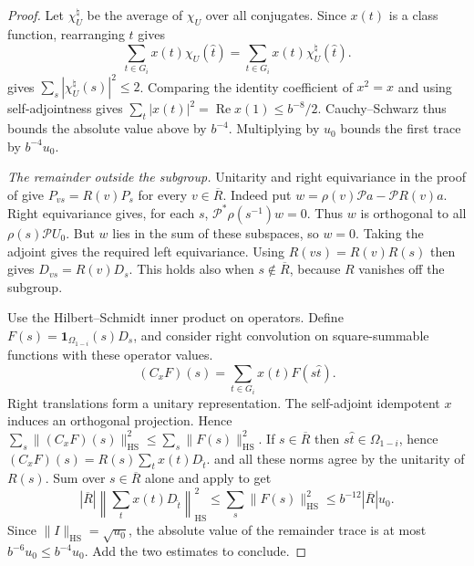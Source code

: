 \begin{proof}
Let $\chi_U^\natural$ be the average of $\chi_U$ over all conjugates.
Since $x(t)$ is a class function, rearranging $t$ gives
\[
 \sum_{t\in G_i}x(t)\chi_U(\widehat t)
 =\sum_{t\in G_i}x(t)\chi_U^\natural(\widehat t).
\]
 gives $\sum_s|\chi_U^\natural(s)|^2\le 2$.
Comparing the identity coefficient of $x^2=x$ and using self-adjointness gives
$\sum_t|x(t)|^2=\operatorname{Re}x(1)\le b^{-8}/2$.
Cauchy--Schwarz thus bounds the absolute value above by $b^{-4}$.
Multiplying by $u_0$ bounds the first trace by $b^{-4}u_0$.

\emph{The remainder outside the subgroup.}
Unitarity and right equivariance in the proof of  give
$P_{vs}=R(v)P_s$ for every $v\in\overline R$.
Indeed put $w=\rho(v)\mathcal P a-\mathcal P R(v)a$.
Right equivariance gives, for each $s$,
$\mathcal P^*\rho(s^{-1})w=0$. Thus $w$ is orthogonal to all $\rho(s)\mathcal P U_0$.
But $w$ lies in the sum of these subspaces, so $w=0$.
Taking the adjoint gives the required left equivariance. Using $R(vs)=R(v)R(s)$ then gives
$D_{vs}=R(v)D_s$. This holds also when $s\notin\overline R$,
because $R$ vanishes off the subgroup.

Use the Hilbert--Schmidt inner product on operators.
Define $F(s)=\mathbf 1_{\Omega_{1-i}}(s)D_s$,
and consider right convolution on square-summable functions with these operator values.
\[
 (C_xF)(s)=\sum_{t\in G_i}x(t)F(s\widehat t).
\]
Right translations form a unitary representation. The self-adjoint idempotent $x$ induces an orthogonal projection.
Hence $\sum_s\|(C_xF)(s)\|_{\mathrm{HS}}^2\le\sum_s\|F(s)\|_{\mathrm{HS}}^2$.
If $s\in\overline R$ then $s\widehat t\in\Omega_{1-i}$,
hence $(C_xF)(s)=R(s)\sum_t x(t)D_{\widehat t}$.
and all these norms agree by the unitarity of $R(s)$.
Sum over $s\in\overline R$ alone and apply  to get
\[
 |\overline R|\left\|\sum_t x(t)D_{\widehat t}\right\|_{\mathrm{HS}}^2
 \le \sum_s\|F(s)\|_{\mathrm{HS}}^2
 \le b^{-12}|\overline R|u_0 .
\]
Since $\|I\|_{\mathrm{HS}}=\sqrt{u_0}$,
the absolute value of the remainder trace is at most $b^{-6}u_0\le b^{-4}u_0$.
Add the two estimates to conclude.
\end{proof}

